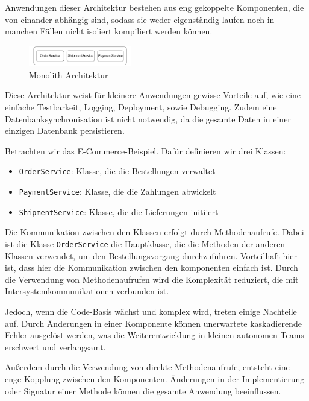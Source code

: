 \documentclass[acmtog]{acmart}
\begin{document}
Anwendungen dieser Architektur bestehen aus eng gekoppelte Komponenten, die von
einander abhängig sind, sodass sie weder eigenständig laufen noch in manchen Fällen
nicht isoliert kompiliert werden können. \cite[485]{mono3}

\begin{figure}[h!]
    \centering
    \includegraphics[width=0.4\textwidth]{images/mono/mono.pdf}
    \caption{Monolith Architektur}
    \label{fig:mono}
\end{figure}

Diese Architektur weist für kleinere Anwendungen gewisse Vorteile auf,
wie eine einfache Testbarkeit, Logging, Deployment, sowie Debugging.
Zudem eine Datenbanksynchronisation ist nicht notwendig, da die
gesamte Daten in einer einzigen Datenbank persistieren. \cite[2]{mono4}

Betrachten wir das E-Commerce-Beispiel.
Dafür definieren wir drei Klassen:
\begin{itemize}
    \item \texttt{OrderService}: Klasse, die die Bestellungen verwaltet
    \item \texttt{PaymentService}: Klasse, die die Zahlungen abwickelt
    \item \texttt{ShipmentService}: Klasse, die die Lieferungen initiiert
\end{itemize}

Die Kommunikation zwischen den Klassen erfolgt durch Methodenaufrufe.
Dabei ist die Klasse \texttt{OrderService} die Hauptklasse, die die
Methoden der anderen Klassen verwendet, um den Bestellungsvorgang durchzuführen.
Vorteilhaft hier ist, dass hier die Kommunikation zwischen den komponenten einfach ist.
Durch die Verwendung von Methodenaufrufen wird die Komplexität reduziert, die mit
Intersystemkommunikationen verbunden ist.

Jedoch, wenn die Code-Basis wächst und komplex wird, treten einige Nachteile auf.
Durch Änderungen in einer Komponente können unerwartete kaskadierende Fehler
ausgelöst werden, was die Weiterentwicklung in kleinen autonomen
Teams erschwert und verlangsamt.

Außerdem durch die Verwendung von direkte Methodenaufrufe, entsteht eine enge Kopplung
zwischen den Komponenten.
Änderungen in der Implementierung oder Signatur einer Methode können die gesamte
 Anwendung beeinflussen.
\end{document}
